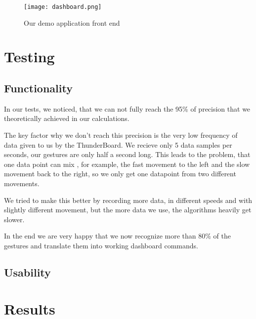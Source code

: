 \begin{figure}[htp]
\begin{center}
  \texttt{[image: dashboard.png]}
\caption{Our demo application front end}
\end{center}
\end{figure} 


\chapter{Testing}
\label{ch:Tests}

\section{Functionality}
\label{ch:Results:sec:Functionality}

In our tests, we noticed, that we can not fully reach the 95\% of precision that we theoretically achieved in our calculations.

The key factor why we don't reach this precision is the very low frequency of data given to us by the ThunderBoard.
We recieve only 5 data samples per seconds, our gestures are only half a second long.
This leads to the problem, that one data point can mix , for example, the fast movement to the left and the slow movement back to the right, so we only get one datapoint from two different movements.

We tried to make this better by recording more data, in different speeds and with slightly different movement, but the more data we use, the algorithms heavily get slower.

In the end we are very happy that we now recognize more than 80\% of the gestures and translate them into working dashboard commands.


\section{Usability}
\label{ch:Results:sec:Usability}


\chapter{Results}
\label{ch:Results}

